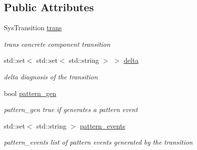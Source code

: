 \subsection*{Public Attributes}
\begin{DoxyCompactItemize}
\item 
Sys\+Transition \hyperlink{class_interface_trans_a0dc9b1b152f1b02fef8bc2d67cb7d740}{trans}\hypertarget{class_interface_trans_a0dc9b1b152f1b02fef8bc2d67cb7d740}{}\label{class_interface_trans_a0dc9b1b152f1b02fef8bc2d67cb7d740}

\begin{DoxyCompactList}\small\item\em trans concrete component transition \end{DoxyCompactList}\item 
std\+::set$<$ std\+::set$<$ std\+::string $>$ $>$ \hyperlink{class_interface_trans_a6524d0e1bca94826f5b396f8ca4a4e79}{delta}\hypertarget{class_interface_trans_a6524d0e1bca94826f5b396f8ca4a4e79}{}\label{class_interface_trans_a6524d0e1bca94826f5b396f8ca4a4e79}

\begin{DoxyCompactList}\small\item\em delta diagnosis of the transition \end{DoxyCompactList}\item 
bool \hyperlink{class_interface_trans_a9ae4095b5f0612ebbf10250305a2e299}{pattern\+\_\+gen}\hypertarget{class_interface_trans_a9ae4095b5f0612ebbf10250305a2e299}{}\label{class_interface_trans_a9ae4095b5f0612ebbf10250305a2e299}

\begin{DoxyCompactList}\small\item\em pattern\+\_\+gen true if generates a pattern event \end{DoxyCompactList}\item 
std\+::set$<$ std\+::string $>$ \hyperlink{class_interface_trans_a55df937fed5137540a5b9e6f9b360bce}{pattern\+\_\+events}\hypertarget{class_interface_trans_a55df937fed5137540a5b9e6f9b360bce}{}\label{class_interface_trans_a55df937fed5137540a5b9e6f9b360bce}

\begin{DoxyCompactList}\small\item\em pattern\+\_\+events list of pattern events generated by the transition \end{DoxyCompactList}\end{DoxyCompactItemize}
